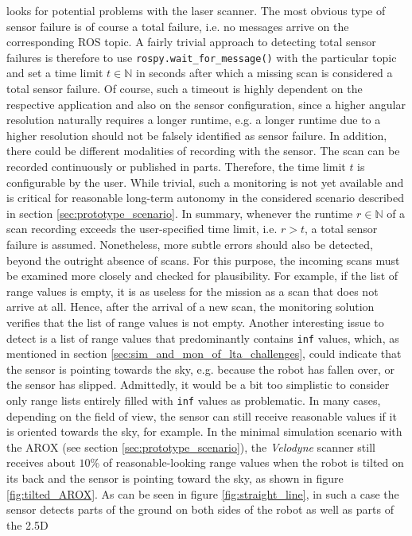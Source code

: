 \documentclass[english, master, utf8]{base/thesis_KBS}
\newcommand{\code}[1]{\colorbox{light-gray}{\texttt{#1}}}
\begin{document}
looks for potential problems with the laser scanner. The most obvious type of sensor failure is of course a total failure, i.e. no messages arrive on the corresponding ROS topic.
A fairly trivial approach to detecting total sensor failures is therefore to use \code{rospy.wait\_for\_message()} with the particular topic and set a time limit $t \in \mathbb{N}$
in seconds after which a missing scan is considered a total sensor failure. Of course, such a timeout is highly dependent on the respective application and also on the sensor 
configuration, since a higher angular resolution naturally requires a longer runtime, e.g. a longer runtime due to a higher resolution should not be falsely identified 
as sensor failure. In addition, there could be different modalities of recording with the sensor. The scan can be recorded continuously or published in parts.
Therefore, the time limit $t$ is configurable by the user. While trivial, such a monitoring is not yet available and is critical for reasonable long-term autonomy in the 
considered scenario described in section \ref{sec:prototype_scenario}. In summary, whenever the runtime $r \in \mathbb{N}$ of a scan recording exceeds the user-specified time
limit, i.e. $r > t$, a total sensor failure is assumed. Nonetheless, more subtle errors should also be detected, beyond the outright absence of scans.
For this purpose, the incoming scans must be examined more closely and checked for plausibility. For example, if the list of range values is empty, it is as useless for
the mission as a scan that does not arrive at all. Hence, after the arrival of a new scan, the monitoring solution verifies that the list of range values is not empty.
Another interesting issue to detect is a list of range values that predominantly contains \code{inf} values, which, as mentioned in section
\ref{sec:sim_and_mon_of_lta_challenges}, could indicate that the sensor is pointing towards the sky, e.g. because the robot has fallen over,
or the sensor has slipped. Admittedly, it would be a bit too simplistic to consider only range lists entirely filled with \code{inf} values as problematic.
In many cases, depending on the field of view, the sensor can still receive reasonable values if it is oriented towards the sky, for example.
In the minimal simulation scenario with the AROX (see section \ref{sec:prototype_scenario}), the \textit{Velodyne} scanner still receives about $10$\% of 
reasonable-looking range values when the robot is tilted on its back and the sensor is pointing toward the sky, as shown in figure \ref{fig:tilted_AROX}.
As can be seen in figure \ref{fig:straight_line}, in such a case the sensor detects parts of the ground on both sides of the robot as well as parts of the 2.5D 
\end{document}
